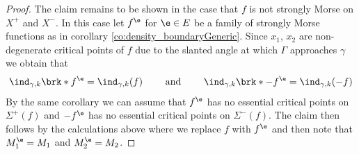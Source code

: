 \begin{proof}
  The claim remains to be shown in the case that $f$ is not strongly Morse on $X^+$ and $X^-$. In this case let
  $f^\e$ for $\e\in E$ be a family of strongly Morse functions as in corollary \ref{co:density_boundaryGeneric}.
  Since $x_1$, $x_2$ are non-degenerate critical points of $f$
  due to the slanted angle at which
  $\Gamma$ approaches $\gamma$
  we obtain that
  \begin{align}
    \ind_{\gamma,k}\brk*{f^\e}=\ind_{\gamma,k}(f)\qquad\text{ and }\qquad 
    \ind_{\gamma,k}\brk*{-f^\e}=\ind_{\gamma,k}(-f)
    \label{eq:n3_disproof_morse_indexApprox}
  \end{align}
  By the same corollary we can assume that $f^\e$ has no essential critical points on
  $\Sigma^+(f)$ and $-f^\e$ has no essential critical points on $\Sigma^-(f)$.
  The claim then follows by the calculations above where we replace
  $f$ with $f^\e$ and then note that $M_1^\e=M_1$ and $M_2^\e=M_2$.
\end{proof}



